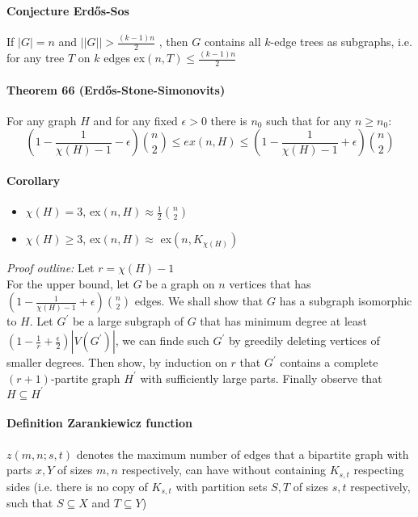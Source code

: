 \paragraph{Conjecture Erd\H{o}s-Sos} If $|G| = n$ and $||G|| > \frac{(k-1)n}{2}$
, then $ G $ contains all $k$-edge trees as subgraphs, i.e. for any tree 
$ T $ on $ k $ edges ex$(n,T) \leq \frac{(k-1)n}{2}$

\paragraph{Theorem 66 (Erd\H{o}s-Stone-Simonovits)} For any graph $ H $ and for
any fixed $ \epsilon > 0 $ there is $ n_0 $ such that for any $ n \geq n_0 $:
$$ (1 - \frac{1}{\chi(H)-1} - \epsilon)\binom{n}{2} \leq ex(n,H) \leq
(1 - \frac{1}{\chi(H)-1}+\epsilon) \binom{n}{2} $$

\paragraph{Corollary}
\begin{itemize}
    \item $\chi(H) = 3$, ex$(n,H) \approx \frac{1}{2}\binom{n}{2}$
    \item $\chi(H) \geq 3$, ex$(n,H) \approx$ ex$(n,K_{\chi(H)})$
\end{itemize}

\noindent
{}

\smallskip \noindent
\textit{Proof outline:} Let $ r = \chi(H) - 1 $ \\
For the upper bound, let $ G $ be a graph on $ n $ vertices that has 
$ (1 - \frac{1}{\chi(H) - 1} + \epsilon) \binom{n}{2} $ edges. We shall show 
that $ G $ has a subgraph isomorphic to $ H $. Let $ G^\prime $ be a large 
subgraph of $ G $ that has minimum degree at least 
$ (1 - \frac{1}{r} + \frac{\epsilon}{2}) |V(G^\prime)|$, we can finde such 
$ G^\prime $ by greedily deleting vertices of smaller degrees. Then show, 
by induction on $ r $ that $ G^\prime $ contains a complete $(r+1)$-partite 
graph $ H^\prime $ with sufficiently large parts. Finally observe that 
$ H \subseteq H^\prime $

\paragraph{Definition Zarankiewicz function} $ z(m,n;s,t) $ denotes the maximum
number of edges that a bipartite graph with parts $ x,Y$ of sizes $ m,n$
respectively, can have without containing $ K_{s,t} $ respecting sides
(i.e. there is no copy of $ K_{s,t} $ with partition sets $ S,T $ of sizes
$s,t $ respectively, such that $ S \subseteq X $ and $ T \subseteq Y $)

